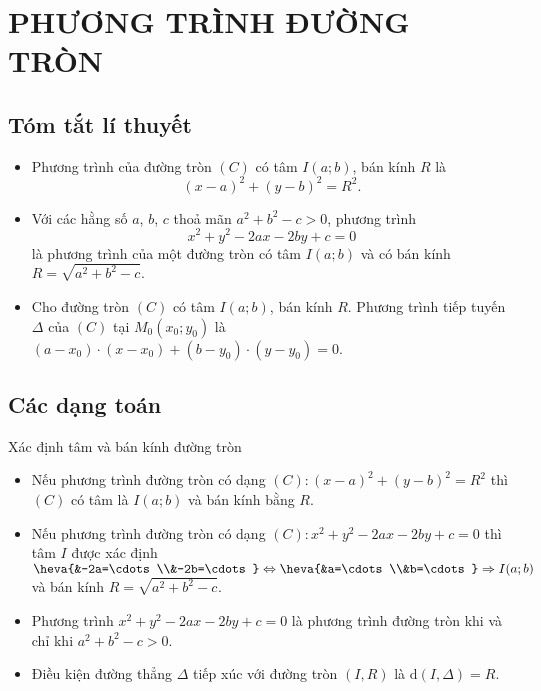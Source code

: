 \section{PHƯƠNG TRÌNH ĐƯỜNG TRÒN}
\subsection{Tóm tắt lí thuyết}
\setcounter{ex}{0}
\setcounter{bt}{0}
\begin{itemize}
	\item Phương trình của đường tròn $(C)$ có tâm $I(a;b)$, bán kính $R$ là
	$$(x-a)^2+(y-b)^2=R^2.$$
	\item Với các hằng số $a$, $b$, $c$ thoả mãn $a^2+b^2-c>0$, phương trình
	$$x^2+y^2-2ax-2by+c=0$$
	là phương trình của một đường tròn có tâm $I(a;b)$ và có bán kính $R=\sqrt{a^2+b^2-c}$.
	\item Cho đường tròn $(C)$ có tâm $I(a;b)$, bán kính $R$. Phương trình tiếp tuyến $\Delta$ của $(C)$ tại $M_0\left(x_0; y_0\right)$ là $\left(a-x_0\right) \cdot \left(x-x_{0}\right)+\left(b-y_{0}\right) \cdot\left(y-y_{0}\right)=0$.
\end{itemize}
\subsection{Các dạng toán}
\begin{dang}{Xác định tâm và bán kính đường tròn}
	\begin{itemize}
		\item Nếu phương trình đường tròn có dạng $(C)\colon \left(x-a\right)^2+\left(y-b\right)^2=R^2$ thì $(C)$ có tâm là $I(a;b)$ và bán kính bằng $R$.
		\item Nếu phương trình đường tròn có dạng $(C)\colon x^2+y^2-2ax-2by+c=0$ thì tâm $I$ được xác định 
		$\heva{&-2a=\cdots\\&-2b=\cdots} \Leftrightarrow \heva{&a=\cdots\\&b=\cdots }\Rightarrow I(a;b)$ và bán kính $R=\sqrt{a^2+b^2-c}$.
	\end{itemize}
	\begin{note}
		\begin{itemize}
			\item Phương trình $x^2+y^2-2ax-2by+c=0$ là phương trình đường tròn khi và chỉ khi $a^2+b^2-c>0$.
			\item Điều kiện đường thẳng $\Delta$ tiếp xúc với đường tròn $(I,R)$ là $\mathrm{d}\left(I,\Delta\right)=R$.
		\end{itemize}
	\end{note}
\end{dang}
